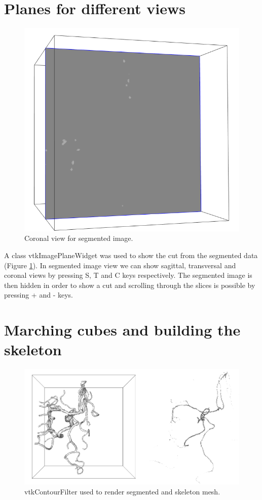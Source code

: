 \section{Planes for different views}

\begin{figure}
	\centering
	\includegraphics[scale=0.3]{fig/image-plane}
	\caption{Coronal view for segmented image.}\label{fig:image-plane}
\end{figure}

A class vtkImagePlaneWidget was used to show the cut from the segmented data (Figure \ref{fig:image-plane}). In segmented image view we can show sagittal, transversal and coronal views by pressing S, T and C keys respectively. The segmented image is then hidden in order to show a cut and scrolling through the slices is possible by pressing + and - keys.

\section{Marching cubes and building the skeleton}

\begin{figure}
	\centering
	\includegraphics[scale=0.6]{fig/segmented-skeleton}
	\caption{vtkContourFilter used to render segmented and skeleton mesh.}\label{fig:segmented-skeleton}
\end{figure}

